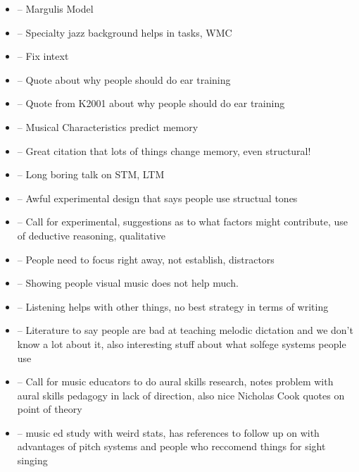\documentclass[]{book}
\providecommand{\tightlist}{%
  \setlength{\itemsep}{0pt}\setlength{\parskip}{0pt}}
\begin{document}
\begin{itemize}
\tightlist
\item
  \citep{margulisModelMelodicExpectation2005} -- Margulis Model
\item
  \citep{nicholsScoreOneJazz2018} -- Specialty jazz background helps in tasks, WMC
\item
  \citep{NASM201718HandbookPdf2018} -- Fix intext
\item
  \citep{schumann1860musikalische} -- Quote about why people should do ear training
\item
  \citep{smith1934solfege} -- Quote from K2001 about why people should do ear training
\item
  \citep{longRelationshipsPitchMemory1977} -- Musical Characteristics predict memory
\item
  \citep{taylorStrategiesMemoryShort1983} -- Great citation that lots of things change memory, even structural!
\item
  \citep{tallaricoStudyThreePhase1974} -- Long boring talk on STM, LTM
\item
  \citep{ouraConstructingRepresentationMelody1991a} -- Awful experimental design that says people use structual tones
\item
  \citep{buonviriExplorationUndergraduateMusic2014} -- Call for experimental, suggestions as to what factors might contribute, use of deductive reasoning, qualitative
\item
  \citep{buonviriEffectsPreparatorySinging2015} -- People need to focus right away, not establish, distractors
\item
  \citep{buonviriEffectsMusicNotation2015} -- Showing people visual music does not help much.
\item
  \citep{buonviriEffectsTwoListening2017} -- Listening helps with other things, no best strategy in terms of writing
\item
  \citep{buonviriMelodicDictationInstruction2015} -- Literature to say people are bad at teaching melodic dictation and we don't know a lot about it, also interesting stuff about what solfege systems people use
\item
  \citep{davidbutlerWhyGulfMusic1997a} -- Call for music educators to do aural skills research, notes problem with aural skills pedagogy in lack of direction, also nice Nicholas Cook quotes on point of theory
\item
  \citep{furbyEffectsPeerTutoring2016} -- music ed study with weird stats, has references to follow up on with advantages of pitch systems and people who reccomend things for sight singing

\end{itemize}
\end{document}
